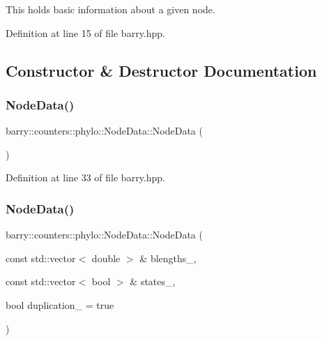 This holds basic information about a given node. 

Definition at line 15 of file barry.\+hpp.



\subsection{Constructor \& Destructor Documentation}
\mbox{\label{classbarry_1_1counters_1_1phylo_1_1_node_data_ab6c4e49f9964d587e4fba24f9bb41b30}} 
\subsubsection{\texorpdfstring{Node\+Data()}{NodeData()}\hspace{0.1cm}{\footnotesize\ttfamily [1/2]}}
{\footnotesize\ttfamily barry\+::counters\+::phylo\+::\+Node\+Data\+::\+Node\+Data (\begin{DoxyParamCaption}{ }\end{DoxyParamCaption})\hspace{0.3cm}{\ttfamily [inline]}}



Definition at line 33 of file barry.\+hpp.

\mbox{\label{classbarry_1_1counters_1_1phylo_1_1_node_data_a0559756b8139d402af5046755992d83a}} 
\subsubsection{\texorpdfstring{Node\+Data()}{NodeData()}\hspace{0.1cm}{\footnotesize\ttfamily [2/2]}}
{\footnotesize\ttfamily barry\+::counters\+::phylo\+::\+Node\+Data\+::\+Node\+Data (\begin{DoxyParamCaption}\item[{const std\+::vector$<$ double $>$ \&}]{blengths\+\_\+,  }\item[{const std\+::vector$<$ bool $>$ \&}]{states\+\_\+,  }\item[{bool}]{duplication\+\_\+ = {\ttfamily true} }\end{DoxyParamCaption})\hspace{0.3cm}{\ttfamily [inline]}}



